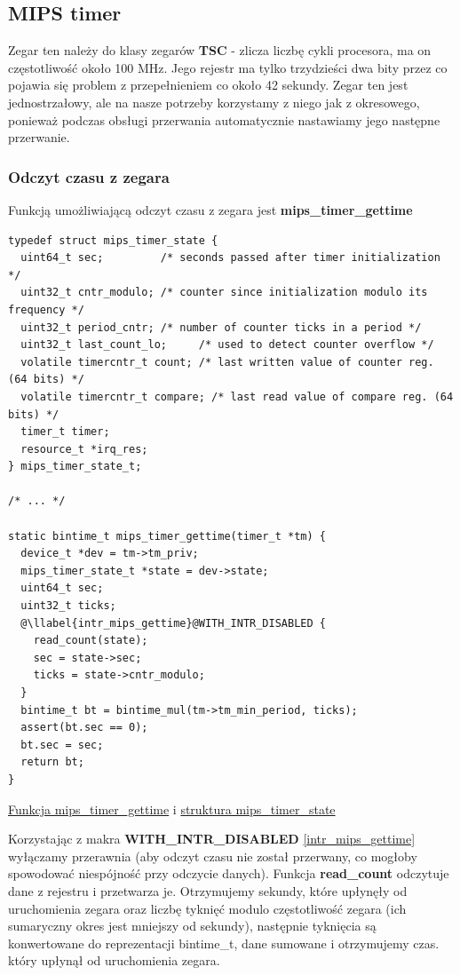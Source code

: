 \documentclass[shortabstract]{iithesis}
\makeatletter
\theoremstyle{definition} \newtheorem*{definition}{Definicja}
\theoremstyle{definition} \newtheorem*{example}{Przykład}
\theoremstyle{definition} \newtheorem*{remark}{Uwaga}
\newenvironment{longlisting}{\captionsetup{type=listing}}{}
\newcounter{llabel}[listing]%
\renewcommand*{\thellabel}{%
    \ifnum\value{llabel}<0 %
      \@ctrerr
    \else
      \ifnum\value{llabel}>10 %
        \@ctrerr
      \else
        \protect\ding{\the\numexpr\value{llabel}+201\relax}%
      \fi
    \fi
  }%
\newlength{\llabelsep}
\newcommand*{\llabel}[1]{%
  \begingroup
  \refstepcounter{llabel}%
  \label{#1}%
  \llap{\thellabel\kern\llabelsep}%
  \endgroup
}
\makeatother
\begin{document}
\subsection{MIPS timer} 
Zegar ten należy do klasy zegarów \textbf{TSC} - zlicza liczbę cykli procesora, ma on częstotliwość około 100 MHz. Jego rejestr ma tylko trzydzieści dwa bity przez co pojawia się problem z przepełnieniem co około 42 sekundy. Zegar ten jest jednostrzałowy, ale na nasze potrzeby korzystamy z niego jak z okresowego, ponieważ podczas obsługi przerwania automatycznie nastawiamy jego następne przerwanie.

\subsubsection{Odczyt czasu z zegara}
Funkcją umożliwiającą odczyt czasu z zegara jest \textbf{mips\_timer\_gettime} 
\begin{longlisting}
  \begin{verbatim}
typedef struct mips_timer_state {
  uint64_t sec;         /* seconds passed after timer initialization */
  uint32_t cntr_modulo; /* counter since initialization modulo its frequency */
  uint32_t period_cntr; /* number of counter ticks in a period */
  uint32_t last_count_lo;     /* used to detect counter overflow */
  volatile timercntr_t count; /* last written value of counter reg. (64 bits) */
  volatile timercntr_t compare; /* last read value of compare reg. (64 bits) */
  timer_t timer;
  resource_t *irq_res;
} mips_timer_state_t;

/* ... */
  
static bintime_t mips_timer_gettime(timer_t *tm) {
  device_t *dev = tm->tm_priv;
  mips_timer_state_t *state = dev->state;
  uint64_t sec;
  uint32_t ticks;
  @\llabel{intr_mips_gettime}@WITH_INTR_DISABLED {
    read_count(state);
    sec = state->sec;
    ticks = state->cntr_modulo;
  }
  bintime_t bt = bintime_mul(tm->tm_min_period, ticks);
  assert(bt.sec == 0);
  bt.sec = sec;
  return bt;
}
  \end{verbatim}
  \caption{\href{https://mimiker.ii.uni.wroc.pl/source/xref/mimiker/sys/mips/timer.c?r=db7eaf68\#11}{Funkcja mips\_timer\_gettime} i \href{https://mimiker.ii.uni.wroc.pl/source/xref/mimiker/sys/mips/timer.c?r=db7eaf68&mo=231&fi=11\#11}{struktura mips\_timer\_state}}
  \label{lst:structmipstimerstate}
\end{longlisting}

Korzystając z makra \textbf{WITH\_INTR\_DISABLED} \ref{intr_mips_gettime} wyłączamy przerawnia (aby odczyt czasu nie został przerwany, co mogłoby spowodować niespójność przy odczycie danych). Funkcja \textbf{read\_count} odczytuje dane z rejestru i przetwarza je. Otrzymujemy sekundy, które upłynęły od uruchomienia zegara oraz liczbę tyknięć modulo częstotliwość zegara (ich sumaryczny okres jest mniejszy od sekundy), następnie tyknięcia są konwertowane do reprezentacji bintime\_t, dane sumowane i otrzymujemy czas. który upłynął od uruchomienia zegara.
\end{document}
